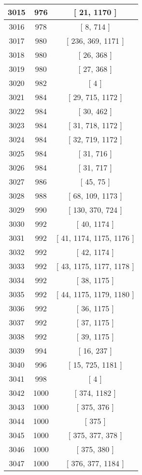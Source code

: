 \begin{center}
\begin{longtable}[H]{|| c c c ||}
\hline
3015 & 976 & [ 21, 1170 ] \\ 
\hline
3016 & 978 & [ 8, 714 ] \\ 
\hline
3017 & 980 & [ 236, 369, 1171 ] \\ 
\hline
3018 & 980 & [ 26, 368 ] \\ 
\hline
3019 & 980 & [ 27, 368 ] \\ 
\hline
3020 & 982 & [ 4 ] \\ 
\hline
3021 & 984 & [ 29, 715, 1172 ] \\ 
\hline
3022 & 984 & [ 30, 462 ] \\ 
\hline
3023 & 984 & [ 31, 718, 1172 ] \\ 
\hline
3024 & 984 & [ 32, 719, 1172 ] \\ 
\hline
3025 & 984 & [ 31, 716 ] \\ 
\hline
3026 & 984 & [ 31, 717 ] \\ 
\hline
3027 & 986 & [ 45, 75 ] \\ 
\hline
3028 & 988 & [ 68, 109, 1173 ] \\ 
\hline
3029 & 990 & [ 130, 370, 724 ] \\ 
\hline
3030 & 992 & [ 40, 1174 ] \\ 
\hline
3031 & 992 & [ 41, 1174, 1175, 1176 ] \\ 
\hline
3032 & 992 & [ 42, 1174 ] \\ 
\hline
3033 & 992 & [ 43, 1175, 1177, 1178 ] \\ 
\hline
3034 & 992 & [ 38, 1175 ] \\ 
\hline
3035 & 992 & [ 44, 1175, 1179, 1180 ] \\ 
\hline
3036 & 992 & [ 36, 1175 ] \\ 
\hline
3037 & 992 & [ 37, 1175 ] \\ 
\hline
3038 & 992 & [ 39, 1175 ] \\ 
\hline
3039 & 994 & [ 16, 237 ] \\ 
\hline
3040 & 996 & [ 15, 725, 1181 ] \\ 
\hline
3041 & 998 & [ 4 ] \\ 
\hline
3042 & 1000 & [ 374, 1182 ] \\ 
\hline
3043 & 1000 & [ 375, 376 ] \\ 
\hline
3044 & 1000 & [ 375 ] \\ 
\hline
3045 & 1000 & [ 375, 377, 378 ] \\ 
\hline
3046 & 1000 & [ 375, 380 ] \\ 
\hline
3047 & 1000 & [ 376, 377, 1184 ] \\ 

\end{longtable}
\end{center}
